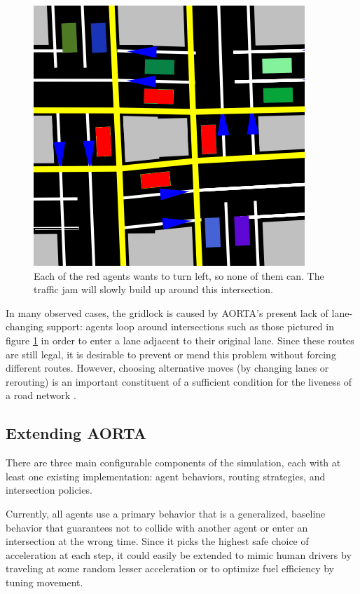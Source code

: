 \documentclass[letterpaper, 10 pt, conference]{ieeeconf}  %
\begin{document}
\begin{figure}[h]
  \centering \includegraphics[scale=0.25]{gridlock.png}
  \caption{Each of the red agents wants to turn left, so none of them
           can. The traffic jam will slowly build up around this intersection.}
  \label{fig:gridlock}
  \vspace{-10pt}
\end{figure}

In many observed cases, the gridlock is caused by AORTA's present lack of
lane-changing support: agents loop around intersections such as those pictured
in figure \ref{fig:gridlock} in order to enter a lane adjacent to their original
lane.  Since these routes are still legal, it is desirable to prevent or mend
this problem without forcing different routes. However, choosing alternative
moves (by changing lanes or rerouting) is an important constituent of a
sufficient condition for the liveness of a road network \cite{AAAI11-au}.

\subsection{Extending AORTA}
\label{sec:config}

There are three main configurable components of the simulation, each with at
least one existing implementation: agent behaviors, routing strategies, and
intersection policies.

Currently, all agents use a primary behavior that is a generalized, baseline
behavior that guarantees not to collide with another agent or enter an
intersection at the wrong time. Since it picks the highest safe choice of
acceleration at each step, it could easily be extended to mimic human drivers by
traveling at some random lesser acceleration or to optimize fuel efficiency
by tuning movement.
\end{document}

